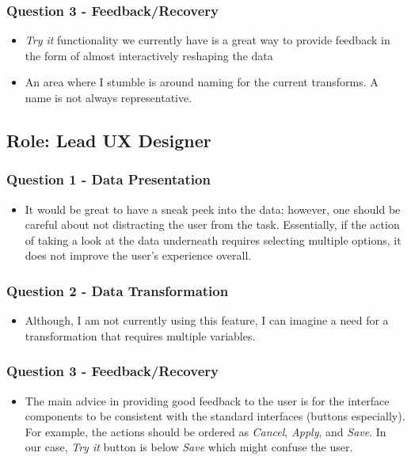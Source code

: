 \documentclass[12pt,letterpaper]{article}
\begin{document}
\subsubsection*{Question 3 - Feedback/Recovery}
\begin{itemize}
    \item \textit{Try it} functionality we currently have is a great way to provide feedback in the form of almost interactively reshaping the data
    \item An area where I stumble is around naming for the current transforms. A name is not always representative.
\end{itemize}

\subsection*{Role: Lead UX Designer}
\subsubsection*{Question 1 - Data Presentation}

\begin{itemize}
    \item It would be great to have a sneak peek into the data; however, one should be careful about not distracting the user from the task. Essentially, if the action of taking a look at the data underneath requires selecting multiple options, it does not improve the user's experience overall. 
\end{itemize}

\subsubsection*{Question 2 - Data Transformation}
\begin{itemize}
    \item Although, I am not currently using this feature, I can imagine a need for a transformation that requires multiple variables.
\end{itemize}

\subsubsection*{Question 3 - Feedback/Recovery}
\begin{itemize}
    \item The main advice in providing good feedback to the user is for the interface components to be consistent with the standard interfaces (buttons especially). For example, the actions should be ordered as \textit{Cancel}, \textit{Apply}, and \textit{Save}. In our case, \textit{Try it} button is below \textit{Save} which might confuse the user.
\end{itemize}
\end{document}
